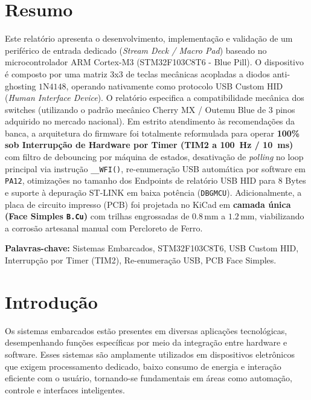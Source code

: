 \documentclass[12pt, a4paper]{article}
\begin{document}
\section*{Resumo}
\hspace*{1.25cm}Este relatório apresenta o desenvolvimento, implementação e validação de um periférico de entrada dedicado (\textit{Stream Deck / Macro Pad}) baseado no microcontrolador ARM Cortex-M3 (STM32F103C8T6 - Blue Pill). O dispositivo é composto por uma matriz 3x3 de teclas mecânicas acopladas a diodos anti-ghosting $1\text{N}4148$, operando nativamente como protocolo USB Custom HID (\textit{Human Interface Device}). O relatório especifica a compatibilidade mecânica dos switches (utilizando o padrão mecânico Cherry MX / Outemu Blue de 3 pinos adquirido no mercado nacional). Em estrito atendimento às recomendações da banca, a arquitetura do firmware foi totalmente reformulada para operar \textbf{100\% sob Interrupção de Hardware por Timer (TIM2 a 100~Hz / 10~ms)} com filtro de debouncing por máquina de estados, desativação de \textit{polling} no loop principal via instrução \texttt{\_\_WFI()}, re-enumeração USB automática por software em \texttt{PA12}, otimizações no tamanho dos Endpoints de relatório USB HID para 8 Bytes e suporte à depuração ST-LINK em baixa potência (\texttt{DBGMCU}). Adicionalmente, a placa de circuito impresso (PCB) foi projetada no KiCad em \textbf{camada única (Face Simples \texttt{B.Cu})} com trilhas engrossadas de $0.8\,\text{mm}$ a $1.2\,\text{mm}$, viabilizando a corrosão artesanal manual com Percloreto de Ferro.

\textbf{Palavras-chave:} Sistemas Embarcados, STM32F103C8T6, USB Custom HID, Interrupção por Timer (TIM2), Re-enumeração USB, PCB Face Simples.

\newpage
\tableofcontents
\newpage

\section{Introdução}
\hspace*{1.25cm}Os sistemas embarcados estão presentes em diversas aplicações tecnológicas, desempenhando funções específicas por meio da integração entre hardware e software. Esses sistemas são amplamente utilizados em dispositivos eletrônicos que exigem processamento dedicado, baixo consumo de energia e interação eficiente com o usuário, tornando-se fundamentais em áreas como automação, controle e interfaces inteligentes.
\end{document}

